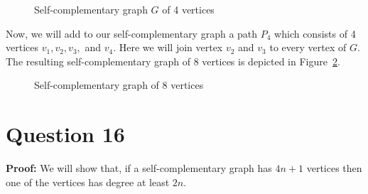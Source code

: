 \documentclass[11pt, oneside]{article}   	%
\begin{document}
{{{{\begin{figure}[h]

\caption{Self-complementary graph $G$ of 4 vertices}
\label{4 nodes}
\end{figure}

Now, we will add to our self-complementary graph a path $P_4$ which consists of 4 vertices $v_1, v_2, v_3,$ and $v_4$. Here we will join vertex $v_2$ and $v_3$ to every vertex of $G$. The resulting self-complementary graph of 8 vertices is depicted in Figure~\ref{8 nodes}.

\begin{figure}[h]
\centering
{}

\caption{Self-complementary graph of 8 vertices}
\label{8 nodes}
\end{figure}

\section*{Question 16}

\textbf{Proof:} We will show that, if a self-complementary graph has $4n+1$ vertices then one of the vertices has degree at least $2n$.

}}}}
\end{document}
